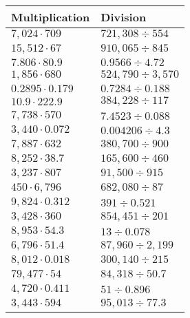 \begin{longtable}[]{@{}ll@{}}
\toprule
Multiplication & Division\tabularnewline
\midrule
\endhead
\(7,024\cdot709\) & \(721,308÷554\)\tabularnewline
\(15,512\cdot67\) & \(910,065÷845\)\tabularnewline
\(7.806\cdot80.9\) & \(0.9566÷4.72\)\tabularnewline
\(1,856\cdot680\) & \(524,790÷3,570\)\tabularnewline
\(0.2895\cdot0.179\) & \(0.7284÷0.188\)\tabularnewline
\(10.9\cdot222.9\) & \(384,228 ÷117\)\tabularnewline
\(7,738\cdot570\) & \(7.4523÷0.088\)\tabularnewline
\(3,440\cdot0.072\) & \(0.004206÷4.3\)\tabularnewline
\(7,887\cdot632\) & \(380,700÷900\)\tabularnewline
\(8,252\cdot38.7\) & \(165,600÷460\)\tabularnewline
\(3,237\cdot807\) & \(91,500÷915\)\tabularnewline
\(450\cdot6,796\) & \(682,080÷87\)\tabularnewline
\(9,824\cdot0.312\) & \(391÷0.521\)\tabularnewline
\(3,428\cdot360\) & \(854,451÷201\)\tabularnewline
\(8,953\cdot54.3\) & \(13÷0.078\)\tabularnewline
\(6,796\cdot51.4\) & \(87,960÷2,199\)\tabularnewline
\(8,012\cdot0.018\) & \(300,140÷215\)\tabularnewline
\(79,477\cdot54\) & \(84,318÷50.7\)\tabularnewline
\(4,720\cdot0.411\) & \(51÷0.896\)\tabularnewline
\(3,443\cdot594\) & \(95,013÷77.3\)\tabularnewline
\bottomrule
\end{longtable}
